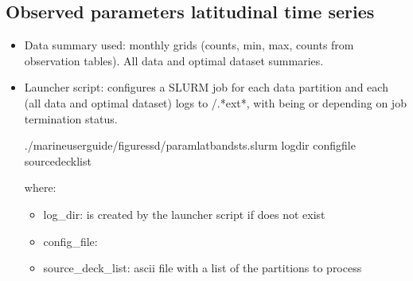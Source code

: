 \documentclass[letterpaper,10pt,english]{sphinxmanual}
\begin{document}
\subsection{Observed parameters latitudinal time series}
\label{\detokenize{index:observed-parameters-latitudinal-time-series}}\begin{itemize}
\item {} 
Data summary used: monthly grids (counts, min, max, counts from observation tables). All data and optimal dataset summaries.

\item {} 
Launcher script: configures a SLURM job for each  data partition and each  (all data and optimal dataset) logs to /\sphinxhyphen{}.*ext*, with  being  or  depending on job termination status.

\begin{sphinxVerbatim}[commandchars=\\\{\}]
./marine\PYGZhy{}user\PYGZhy{}guide/figures\PYGZus{}sd/param\PYGZus{}lat\PYGZus{}bands\PYGZus{}ts.slurm log\PYGZus{}dir config\PYGZus{}file source\PYGZus{}deck\PYGZus{}list
\end{sphinxVerbatim}

where:
\begin{itemize}
\item {} 
log\_dir: is created by the launcher script if does not exist

\item {} 
config\_file: {\hyperref[\detokenize{index:param-lat-bands-ts}]{}}

\item {} 
source\_deck\_list: ascii file with a list of the  partitions to process

\end{itemize}

\end{itemize}
\end{document}
